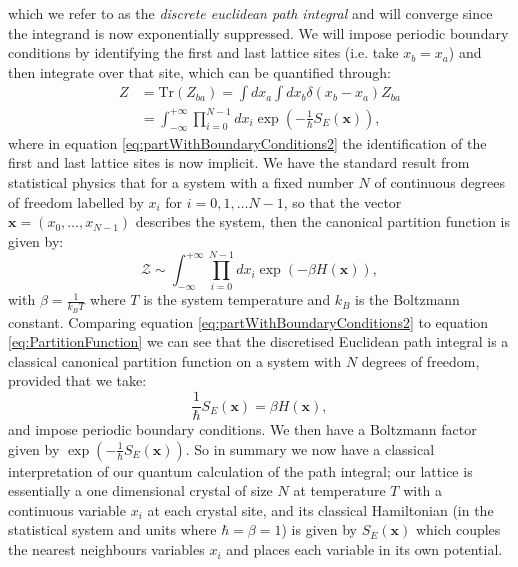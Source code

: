 \documentclass[12pt]{article}
\begin{document}
        which we refer to as the \textit{discrete euclidean path integral} and will converge since the integrand is now exponentially suppressed. We will impose periodic boundary conditions by identifying the first and last lattice sites (i.e. take $x_b=x_a$) and then integrate over that site, which can be quantified through: 
        \begin{align}
            \label{eq:partWithBoundaryConditions1}
            Z & = \text{Tr}\left(Z_{ba}\right) = \int dx_a \int dx_b \delta\left(x_b-x_a\right)Z_{ba} \\
            \label{eq:partWithBoundaryConditions2}
              & = \int^{+\infty}_{-\infty}\prod_{i=0}^{N-1}dx_i \exp{\left(-\frac{1}{\hbar}S_{E}\left(\bm{x}\right)\right)},
        \end{align}
        where in equation \ref{eq:partWithBoundaryConditions2} the identification of the first and last lattice sites is now implicit. We have the standard result from statistical physics that for a system with a fixed number $N$ of continuous degrees of freedom labelled by $x_i$ for $i=0,1,\dots N-1$, so that the vector $\bm{x}=\left(x_0,\dots,x_{N-1}\right)$ describes the system, then the canonical partition function is given by:
        \begin{equation}
            \label{eq:PartitionFunction}
            \mathcal{Z} \sim \int_{-\infty}^{+\infty}\prod_{i=0}^{N-1}dx_{i}\exp{\left(-\beta H\left(\bm{x}\right)\right)},
        \end{equation}
        with $\beta=\frac{1}{k_{B}T}$ where $T$ is the system temperature and $k_{B}$ is the Boltzmann constant. Comparing equation \ref{eq:partWithBoundaryConditions2} to equation \ref{eq:PartitionFunction} we can see that the discretised Euclidean path integral is a classical canonical partition function on a system with $N$ degrees of freedom, provided that we take:
        \begin{equation}
            \label{ActionToHamiltonian}
            \frac{1}{\hbar}S_{E}\left(\bm{x}\right) = \beta H\left(\bm{x}\right),
        \end{equation}
        and impose periodic boundary conditions. We then have a Boltzmann factor given by $\exp{\left(-\frac{1}{\hbar}S_{E}\left(\bm{x}\right)\right)}$. So in summary we now have a classical interpretation of our quantum calculation of the path integral; our lattice is essentially a one dimensional crystal of size $N$ at temperature $T$ with a continuous variable $x_i$ at each crystal site, and its classical Hamiltonian (in the statistical system and units where $\hbar=\beta=1$) is given by $S_E\left(\bm{x}\right)$ which couples the nearest neighbours variables $x_i$ and places each variable in its own potential. 
\end{document}
